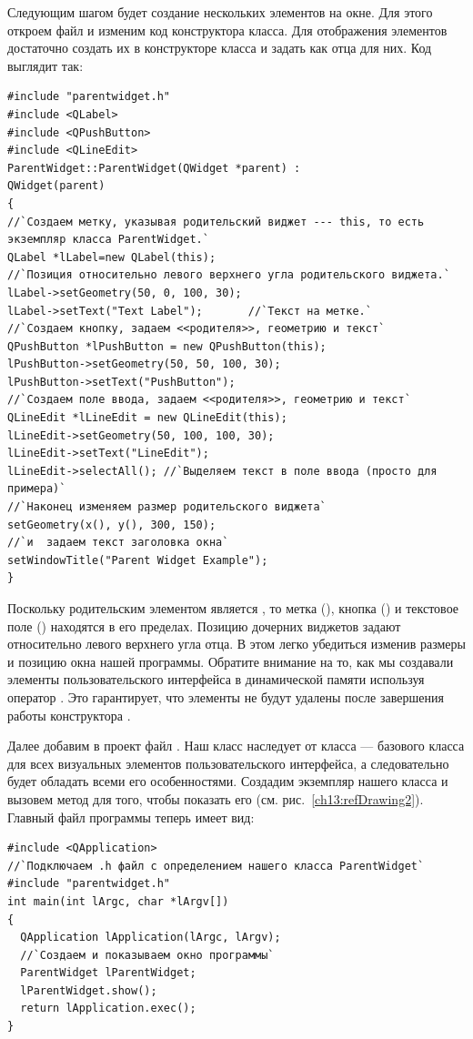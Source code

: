 Следующим шагом будет создание нескольких элементов на окне. Для этого откроем файл  и изменим
код конструктора класса. Для отображения элементов достаточно создать их в конструкторе класса и задать
 как отца для них. Код  выглядит так:
\begin{lstlisting}
#include "parentwidget.h"
#include <QLabel>
#include <QPushButton>
#include <QLineEdit>
ParentWidget::ParentWidget(QWidget *parent) :
QWidget(parent)
{
//`Создаем метку, указывая родительский виджет --- this, то есть экземпляр класса ParentWidget.`
QLabel *lLabel=new QLabel(this);
//`Позиция относительно левого верхнего угла родительского виджета.`
lLabel->setGeometry(50, 0, 100, 30);
lLabel->setText("Text Label");       //`Текст на метке.`
//`Создаем кнопку, задаем <<родителя>>, геометрию и текст`
QPushButton *lPushButton = new QPushButton(this);
lPushButton->setGeometry(50, 50, 100, 30);
lPushButton->setText("PushButton");
//`Создаем поле ввода, задаем <<родителя>>, геометрию и текст`
QLineEdit *lLineEdit = new QLineEdit(this);
lLineEdit->setGeometry(50, 100, 100, 30);
lLineEdit->setText("LineEdit");
lLineEdit->selectAll(); //`Выделяем текст в поле ввода (просто для примера)`
//`Наконец изменяем размер родительского виджета`
setGeometry(x(), y(), 300, 150);
//`и  задаем текст заголовка окна`
setWindowTitle("Parent Widget Example");
}
\end{lstlisting}

Поскольку родительским элементом является , то метка (), 
кнопка () и текстовое
поле () находятся в его пределах. Позицию дочерних виджетов 
задают относительно левого верхнего угла отца. В
этом легко убедиться изменив размеры и позицию окна нашей программы. Обратите внимание 
на то, как мы создавали элементы
пользовательского интерфейса в динамической памяти используя оператор . Это гарантирует, что элементы не
будут удалены после завершения работы конструктора .

Далее добавим в проект файл . Наш класс наследует от 
класса  --- базового класса для всех
визуальных элементов пользовательского интерфейса, а следовательно будет 
обладать всеми его особенностями. Создадим
экземпляр нашего класса и вызовем метод  для того, чтобы показать 
его (см. рис.~\ref{ch13:refDrawing2}).
Главный файл программы теперь имеет вид:
\begin{lstlisting}
#include <QApplication>
//`Подключаем .h файл с определением нашего класса ParentWidget`
#include "parentwidget.h"
int main(int lArgc, char *lArgv[])
{
  QApplication lApplication(lArgc, lArgv);
  //`Создаем и показываем окно программы`
  ParentWidget lParentWidget;
  lParentWidget.show();
  return lApplication.exec();
}
\end{lstlisting}


